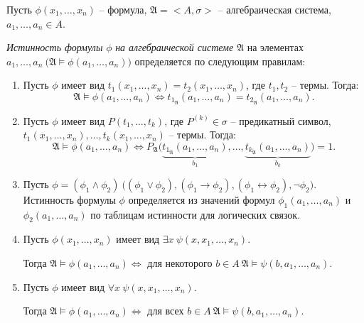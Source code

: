 \begin{definition}
    Пусть $ \phi(x_1,\ldots,x_n) $ -- формула, $ \mathfrak{A} = <A,\sigma> $ -- алгебраическая система,\\$ a_1,\ldots,a_n \in A $.

        \emph{Истинность формулы} $ \phi $ \emph{на алгебраической системе} $ \mathfrak{A} $ на элементах $ a_1,\ldots,a_n \ \big(\mathfrak{A} \vDash \phi(a_1,\ldots,a_n)\big) $ определяется по следующим правилам:
    \begin{enumerate}
        \item Пусть $ \phi $ имеет вид $ t_1(x_1,\ldots,x_n) = t_2(x_1,\ldots,x_n) $, где $ t_1,t_2 $ -- термы. Тогда:
              \[
                  \mathfrak{A} \vDash \phi(a_1,\ldots,a_n)\iff t_{1_\mathfrak{A}}(a_1,\ldots,a_n) = t_{2_\mathfrak{A}} (a_1,\ldots,a_n).
              \]

        \item Пусть $ \phi $ имеет вид $ P(t_1,\ldots,t_k) $, где $ P^{(k)}\in \sigma $ -- предикатный символ, $ t_1(x_1,\ldots,x_n),\ldots,t_k(x_1,\ldots,x_n) $ -- термы. Тогда:
              \[
                  \mathfrak{A}\vDash \phi(a_1,\ldots,a_n) \iff P_\mathfrak{A}\big(\underbrace{t_{1_\mathfrak{A}}(a_1,\ldots,a_n)}_{b_1},\ldots,\underbrace{t_{k_\mathfrak{A}}(a_1,\ldots,a_n)}_{b_k}\big) = 1.
              \]

        \item Пусть $ \phi = (\phi_1 \land \phi_2) \ \big((\phi_1 \lor \phi_2),(\phi_1 \rightarrow \phi_2),(\phi_1 \leftrightarrow \phi_2),\lnot\phi_2\big) $. Истинность формулы $ \phi $ определяется из значений формул $ \phi_1(a_1,\ldots,a_n) $ и $ \phi_2(a_1,\ldots,a_n) $ по таблицам истинности для логических связок.

        \item Пусть $ \phi(x_1,\ldots,x_n) $ имеет вид $ \exists x \ \psi (x,x_1,\ldots,x_n) $.

              Тогда $ \mathfrak{A} \vDash \phi (a_1,\ldots,a_n) \iff $ для некоторого $ b \in A \ \mathfrak{A} \vDash \psi(b,a_1,\ldots,a_n) $.

        \item Пусть $ \phi $ имеет вид $ \forall x \ \psi(x,x_1,\ldots,x_n) $.

              Тогда $ \mathfrak{A} \vDash \phi(a_1,\ldots,a_n) \iff $ для всех $ b\in A \ \mathfrak{A}\vDash\psi(b,a_1,\ldots,a_n) $.
    \end{enumerate}
\end{definition}

